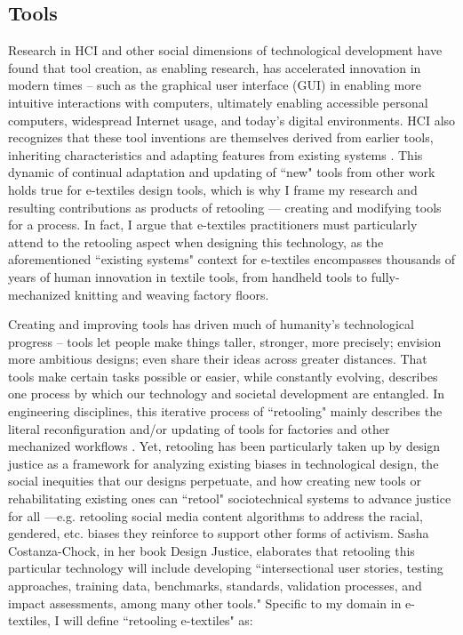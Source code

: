 

\subsection{ Tools}

Research in HCI and other social dimensions of technological development have found that tool creation, as enabling research, has accelerated innovation in modern times -- such as the graphical user interface (GUI) in enabling more intuitive interactions with computers, ultimately enabling accessible personal computers, widespread Internet usage, and today's digital environments. HCI also recognizes that these tool inventions are themselves derived from earlier tools, inheriting characteristics and adapting features from existing systems \todo{[61]}. This dynamic of continual adaptation and updating of ``new" tools from other work holds true for e-textiles design tools, which is why I frame my research and resulting contributions as products of retooling --- creating and modifying tools for a process. In fact, I argue that e-textiles practitioners must particularly attend to the retooling aspect when designing this technology, as the aforementioned ``existing systems" context for e-textiles encompasses thousands of years of human innovation in textile tools, from handheld tools to fully-mechanized knitting and weaving factory floors.

Creating and improving tools has driven much of humanity's technological progress -- tools let people make things taller, stronger, more precisely; envision more ambitious designs; even share their ideas across greater distances. That tools make certain tasks possible or easier, while constantly evolving, describes one process by which our technology and societal development are entangled. In engineering disciplines, this iterative process of ``retooling" mainly describes the literal reconfiguration and/or updating of tools for factories and other mechanized workflows \todo{[152]}. Yet, retooling has been particularly taken up by design justice as a framework for analyzing existing biases in technological design, the social inequities that our designs perpetuate, and how creating new tools or rehabilitating existing ones can ``retool" sociotechnical systems to advance justice for all \todo{[33]}---e.g. retooling social media content algorithms to address the racial, gendered, etc. biases they reinforce to support other forms of activism. Sasha Costanza-Chock, in her book Design Justice, elaborates that retooling this particular technology will include developing ``intersectional user stories, testing approaches, training data, benchmarks, standards, validation processes, and impact assessments, among many other tools." Specific to my domain in e-textiles, I will define ``retooling e-textiles" as:

